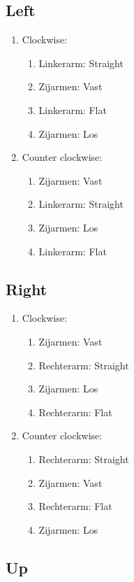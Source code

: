 \subsection{Left}

\begin{enumerate}
	\item Clockwise:
	\begin{enumerate}
		\item Linkerarm: Straight
		\item Zijarmen: Vast
		\item Linkerarm: Flat
		\item Zijarmen: Los
	\end{enumerate}
	\item Counter clockwise:
	\begin{enumerate}
		\item Zijarmen: Vast
		\item Linkerarm: Straight
		\item Zijarmen: Los
		\item Linkerarm: Flat
	\end{enumerate}
\end{enumerate}
\newpage

\subsection{Right}

\begin{enumerate}
	\item Clockwise:
	\begin{enumerate}
		\item Zijarmen: Vast
		\item Rechterarm: Straight
		\item Zijarmen: Los
		\item Rechterarm: Flat
	\end{enumerate}
	\item Counter clockwise:
	\begin{enumerate}
		\item Rechterarm: Straight
		\item Zijarmen: Vast
		\item Rechterarm: Flat
		\item Zijarmen: Los
	\end{enumerate}
\end{enumerate}
\newpage

\subsection{Up}

